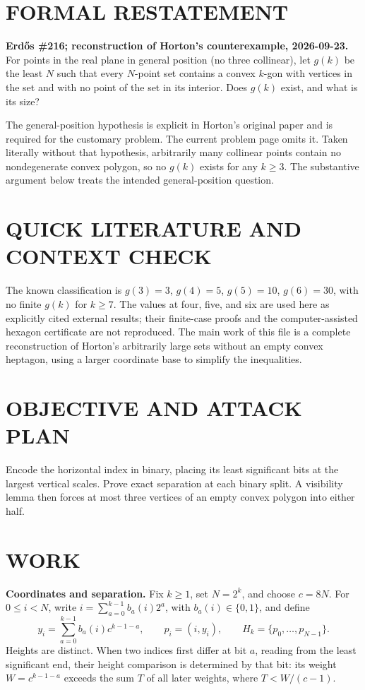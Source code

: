 \section{FORMAL RESTATEMENT}
\textbf{Erd\H{o}s \#216; reconstruction of Horton's counterexample, 2026-09-23.}
For points in the real plane in general position (no three collinear), let $g(k)$ be the least $N$ such that every $N$-point set contains a convex $k$-gon with vertices in the set and with no point of the set in its interior. Does $g(k)$ exist, and what is its size?

The general-position hypothesis is explicit in Horton's original paper and is required for the customary problem. The current problem page omits it. Taken literally without that hypothesis, arbitrarily many collinear points contain no nondegenerate convex polygon, so no $g(k)$ exists for any $k\geq3$. The substantive argument below treats the intended general-position question.

\section{QUICK LITERATURE AND CONTEXT CHECK}
The known classification is $g(3)=3$, $g(4)=5$, $g(5)=10$, $g(6)=30$, with no finite $g(k)$ for $k\geq7$. The values at four, five, and six are used here as explicitly cited external results; their finite-case proofs and the computer-assisted hexagon certificate are not reproduced. The main work of this file is a complete reconstruction of Horton's arbitrarily large sets without an empty convex heptagon, using a larger coordinate base to simplify the inequalities.

\section{OBJECTIVE AND ATTACK PLAN}
Encode the horizontal index in binary, placing its least significant bits at the largest vertical scales. Prove exact separation at each binary split. A visibility lemma then forces at most three vertices of an empty convex polygon into either half.

\section{WORK}
\textbf{Coordinates and separation.} Fix $k\geq1$, set $N=2^k$, and choose $c=8N$. For $0\leq i<N$, write $i=\sum_{a=0}^{k-1}b_a(i)2^a$, with $b_a(i)\in\{0,1\}$, and define
\[
y_i=\sum_{a=0}^{k-1}b_a(i)c^{k-1-a},
\qquad p_i=(i,y_i),\qquad H_k=\{p_0,\ldots,p_{N-1}\}.
\tag{1}
\]
Heights are distinct. When two indices first differ at bit $a$, reading from the least significant end, their height comparison is determined by that bit: its weight $W=c^{k-1-a}$ exceeds the sum $T$ of all later weights, where $T<W/(c-1)$.


